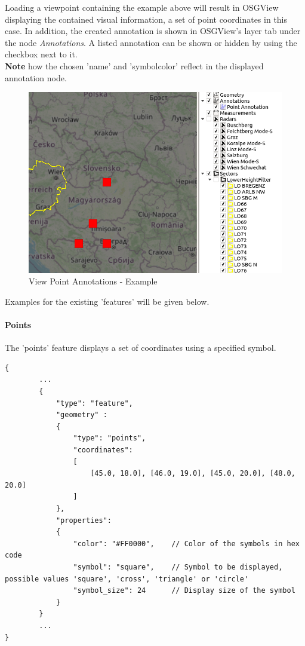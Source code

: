 Loading a viewpoint containing the example above will result in OSGView displaying the contained visual information,
a set of point coordinates in this case. In addition, the created annotation is shown in OSGView's layer tab under the node \textit{Annotations}.
A listed annotation can be shown or hidden by using the checkbox next to it. \\

\textbf{Note} how the chosen 'name' and 'symbol\textunderscore color' reflect in the displayed annotation node.

\begin{figure}[H]
    \center
      \includegraphics[width=12cm]{figures/viewpoints_anno_example.png}
    \caption{View Point Annotations - Example} 
\end{figure}

Examples for the existing 'features' will be given below.

\paragraph{Points} The 'points' feature displays a set of coordinates using a specified symbol.

\begin{lstlisting}[basicstyle=\small\ttfamily]
{
        ...
        {
            "type": "feature",
            "geometry" :
            {
                "type": "points",
                "coordinates": 
                [
                    [45.0, 18.0], [46.0, 19.0], [45.0, 20.0], [48.0, 20.0]
                ]
            },
            "properties":
            {
                "color": "#FF0000",    // Color of the symbols in hex code
                "symbol": "square",    // Symbol to be displayed, possible values 'square', 'cross', 'triangle' or 'circle'   
                "symbol_size": 24      // Display size of the symbol
            }
        }
        ...
}
\end{lstlisting}

